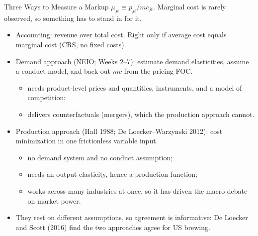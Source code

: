 \documentclass[aspectratio=169,10pt]{beamer}
\begin{document}
\begin{frame}{Three Ways to Measure a Markup}
$\mu_{jt} \equiv p_{jt}/mc_{jt}$. Marginal cost is rarely observed, so something has to stand in for it.
\begin{itemize}
\item \alert{Accounting}: revenue over total cost. Right only if average cost equals marginal cost (CRS, no fixed costs).
\item \alert{Demand approach} (NEIO; Weeks 2--7): estimate demand elasticities, assume a conduct model, and back out $mc$ from the pricing FOC.
\begin{itemize}
\item needs product-level prices and quantities, instruments, and a model of competition;
\item delivers counterfactuals (mergers), which the production approach cannot.
\end{itemize}
\item \alert{Production approach} (Hall 1988; De Loecker--Warzynski 2012): cost minimization in one frictionless variable input.
\begin{itemize}
\item no demand system and no conduct assumption;
\item needs an output elasticity, hence a production function;
\item works across many industries at once, so it has driven the macro debate on market power.
\end{itemize}
\item They rest on different assumptions, so agreement is informative: De Loecker and Scott (2016) find the two approaches agree for US brewing.
\end{itemize}
\end{frame}
\end{document}
